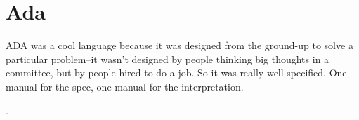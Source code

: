 \section{Ada}

ADA was a cool language because it was designed from the ground-up to solve
a particular problem--it wasn't designed by people thinking big thoughts
in a committee, but by people hired to do a job.
So it was really well-specified. One manual for the spec, one manual for the
interpretation.

.
